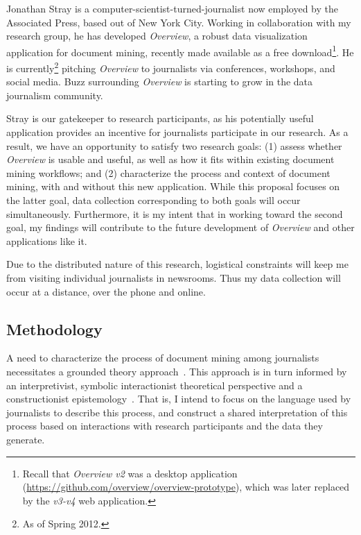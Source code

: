 Jonathan Stray is a computer-scientist-turned-journalist now employed by the Associated Press, based out of New York City. 
Working in collaboration with my research group, he has developed {\it Overview}, a robust data visualization application for document mining, recently made available as a free download\footnote{Recall that {\it Overview v2} was a desktop application (\url{https://github.com/overview/overview-prototype}), which was later replaced by the {\it v3-v4} web application.}. 
He is currently\footnote{As of Spring 2012.} pitching {\it Overview} to journalists via conferences, workshops, and social media. 
Buzz surrounding {\it Overview} is starting to grow in the data journalism community.

Stray is our gatekeeper to research participants, as his potentially useful application provides an incentive for journalists participate in our research. 
As a result, we have an opportunity to satisfy two research goals: (1) assess whether {\it Overview} is usable and useful, as well as how it fits within existing document mining workflows; and (2) characterize the process and context of document mining, with and without this new application. 
While this proposal focuses on the latter goal, data collection corresponding to both goals will occur simultaneously. 
Furthermore, it is my intent that in working toward the second goal, my findings will contribute to the future development of {\it Overview} and other applications like it.

Due to the distributed nature of this research, logistical constraints will keep me from visiting individual journalists in newsrooms. 
Thus my data collection will occur at a distance, over the phone and online.

\subsection{Methodology}
\label{app:overview:proposal-methodology}

A need to characterize the process of document mining among journalists necessitates a grounded theory approach~\cite{Charmaz2006}. 
This approach is in turn informed by an interpretivist, symbolic interactionist theoretical perspective and a constructionist epistemology~\cite{Crotty1998}. 
That is, I intend to focus on the language used by journalists to describe this process, and construct a shared interpretation of this process based on interactions with research participants and the data they generate.


